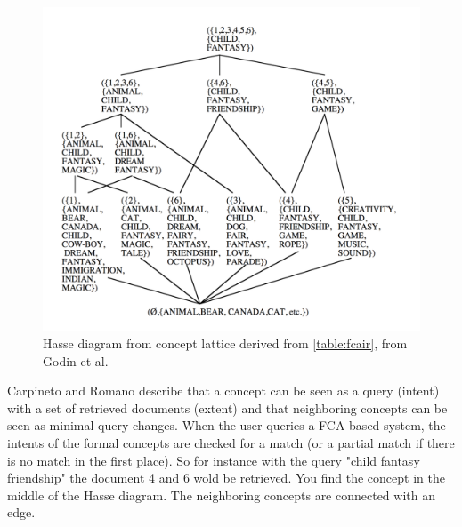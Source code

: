 \documentclass[11pt]{report}
\begin{document}
\begin{figure}[!ht]
	\centering
	\includegraphics[width=\linewidth]{./images/fcair}
\caption{Hasse diagram from concept lattice derived from \ref{table:fcair}, from Godin et al. \cite{Godin1993}}
\label{figure:fcair}
\end{figure}

Carpineto and Romano \cite{Carpineto2005} describe that a concept can be seen as a query (intent) with a set of retrieved documents (extent) and that neighboring concepts can be seen as minimal query changes. When the user queries a FCA-based system, the intents of the formal concepts are checked for a match (or a partial match if there is no match in the first place). So for instance with the query "child fantasy friendship" the document 4 and 6 wold be retrieved. You find the concept in the middle of the Hasse diagram. The neighboring concepts are connected with an edge. \\
\end{document}
